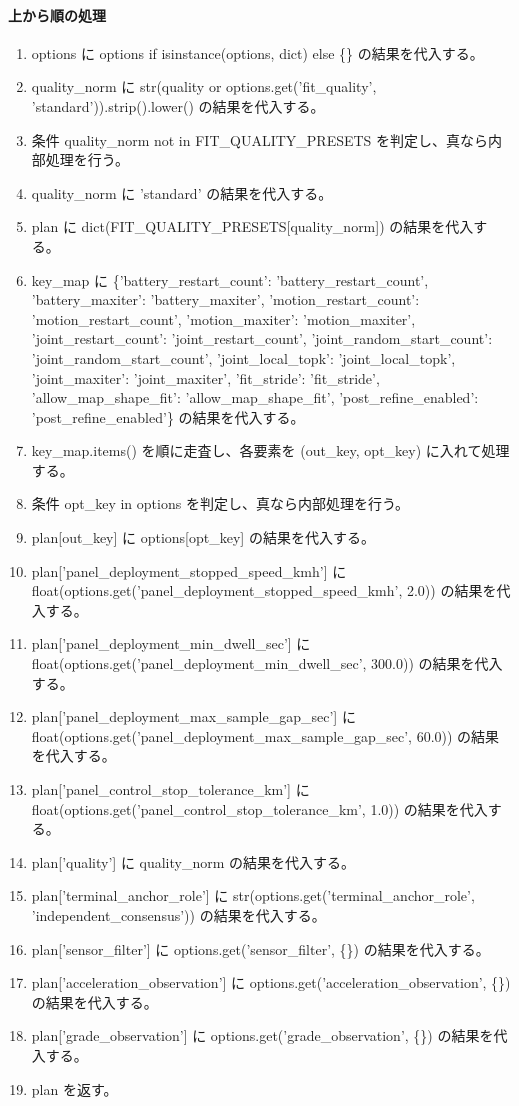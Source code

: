 \documentclass[a4paper,11pt]{article}
\begin{document}
            \paragraph{上から順の処理}
            \begin{enumerate}[leftmargin=1.8em]
            \item options に options if isinstance(options, dict) else \{\} の結果を代入する。
\item quality\_norm に str(quality or options.get('fit\_quality', 'standard')).strip().lower() の結果を代入する。
\item 条件 quality\_norm not in FIT\_QUALITY\_PRESETS を判定し、真なら内部処理を行う。
\item   quality\_norm に 'standard' の結果を代入する。
\item plan に dict(FIT\_QUALITY\_PRESETS[quality\_norm]) の結果を代入する。
\item key\_map に \{'battery\_restart\_count': 'battery\_restart\_count', 'battery\_maxiter': 'battery\_maxiter', 'motion\_restart\_count': 'motion\_restart\_count', 'motion\_maxiter': 'motion\_maxiter', 'joint\_restart\_count': 'joint\_restart\_count', 'joint\_random\_start\_count': 'joint\_random\_start\_count', 'joint\_local\_topk': 'joint\_local\_topk', 'joint\_maxiter': 'joint\_maxiter', 'fit\_stride': 'fit\_stride', 'allow\_map\_shape\_fit': 'allow\_map\_shape\_fit', 'post\_refine\_enabled': 'post\_refine\_enabled'\} の結果を代入する。
\item key\_map.items() を順に走査し、各要素を (out\_key, opt\_key) に入れて処理する。
\item   条件 opt\_key in options を判定し、真なら内部処理を行う。
\item     plan[out\_key] に options[opt\_key] の結果を代入する。
\item plan['panel\_deployment\_stopped\_speed\_kmh'] に float(options.get('panel\_deployment\_stopped\_speed\_kmh', 2.0)) の結果を代入する。
\item plan['panel\_deployment\_min\_dwell\_sec'] に float(options.get('panel\_deployment\_min\_dwell\_sec', 300.0)) の結果を代入する。
\item plan['panel\_deployment\_max\_sample\_gap\_sec'] に float(options.get('panel\_deployment\_max\_sample\_gap\_sec', 60.0)) の結果を代入する。
\item plan['panel\_control\_stop\_tolerance\_km'] に float(options.get('panel\_control\_stop\_tolerance\_km', 1.0)) の結果を代入する。
\item plan['quality'] に quality\_norm の結果を代入する。
\item plan['terminal\_anchor\_role'] に str(options.get('terminal\_anchor\_role', 'independent\_consensus')) の結果を代入する。
\item plan['sensor\_filter'] に options.get('sensor\_filter', \{\}) の結果を代入する。
\item plan['acceleration\_observation'] に options.get('acceleration\_observation', \{\}) の結果を代入する。
\item plan['grade\_observation'] に options.get('grade\_observation', \{\}) の結果を代入する。
\item plan を返す。
            \end{enumerate}
\end{document}
